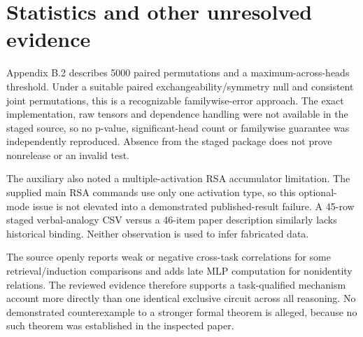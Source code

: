 \documentclass[10pt]{article}
\begin{document}
\section*{Statistics and other unresolved evidence}
Appendix B.2 describes 5000 paired permutations and a maximum-across-heads threshold. Under a suitable paired exchangeability/symmetry null and consistent joint permutations, this is a recognizable familywise-error approach. The exact implementation, raw tensors and dependence handling were not available in the staged source, so no p-value, significant-head count or familywise guarantee was independently reproduced. Absence from the staged package does not prove nonrelease or an invalid test.\par
The auxiliary also noted a multiple-activation RSA accumulator limitation. The supplied main RSA commands use only one activation type, so this optional-mode issue is not elevated into a demonstrated published-result failure. A 45-row staged verbal-analogy CSV versus a 46-item paper description similarly lacks historical binding. Neither observation is used to infer fabricated data.\par
The source openly reports weak or negative cross-task correlations for some retrieval/induction comparisons and adds late MLP computation for nonidentity relations. The reviewed evidence therefore supports a task-qualified mechanism account more directly than one identical exclusive circuit across all reasoning. No demonstrated counterexample to a stronger formal theorem is alleged, because no such theorem was established in the inspected paper.\par
\end{document}
